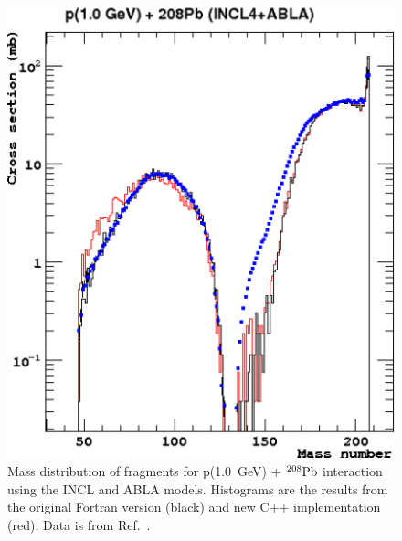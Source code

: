 \documentclass[a4paper]{jpconf}
\begin{document}
\begin{figure}[h]
\begin{minipage}{9.0cm}
\includegraphics[scale=0.80]{images/proton1000MeVPbzoomed.eps}
\end{minipage}\hspace{2pc}%
\begin{minipage}{6cm}
\caption{\label{fig:fragpb}Mass distribution of 
fragments  for p(1.0~GeV) + $^{208}{\rm Pb}$ interaction 
using the INCL and ABLA  models.
Histograms are the results from the original Fortran version (black) 
and new C++ implementation (red). Data is from Ref.~\cite{gsifragments}.
}
\end{minipage}

\end{figure}
\end{document}
